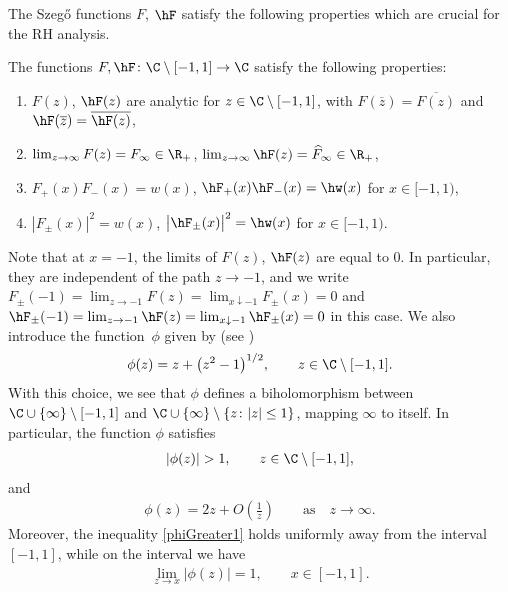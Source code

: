 The Szeg\H{o} functions $F$, $\hF$ satisfy the following properties which are crucial for the RH analysis.

\begin{Proposition}\label{PropertiesF}
The functions $F, \hF \colon \C \setminus [-1,1]\to \C$ satisfy the following properties:
\begin{enumerate}[$(i)$]\itemsep=0pt
 \item $F(z)$, $\hF(z)$ are analytic for $z \in \C \setminus [-1,1]$, with $F(\overline{z}) = \overline{F(z)}$ and $\hF(\overline{z}) = \overline{\hF(z)}$,
 \item $\lim_{z\to\infty} F(z) = F_\infty \in \R_+$, $\lim_{z\to\infty} \hF(z) = \widehat F_\infty \in \R_+$,
 \item $F_+(x)F_-(x) = w(x)$, $\hF_+(x)\hF_-(x) = \hw(x)$ for $x \in [-1,1)$,
 \item $|F_\pm(x)|^2 = w(x)$, $\big|\hF_\pm(x)\big|^2 = \hw(x)$ for $x \in [-1,1)$.
\end{enumerate}
\end{Proposition}
Note that at $x = -1$, the limits of $F(z)$, $\hF(z)$ are equal to $0$. In particular, they are independent of the path $z \to -1$, and we write $F_\pm(-1) = \lim_{z\to -1} F(z) = \lim_{x \downarrow -1} F_\pm(x) = 0$ and $\hF_\pm(-1) = \lim_{z\to -1} \hF(z) = \lim_{x \downarrow -1} \hF_\pm(x) = 0$ in this case.
We also introduce the function~$\phi$ given by (see \cite[Proposition~2.1]{CD})
\begin{align*}
 \phi(z) = z + \big(z^2-1\big)^{1/2}, \qquad z \in \C \setminus [-1,1].
\end{align*}
With this choice, we see that $\phi$ defines a biholomorphism between $\C \cup\lbrace \infty \rbrace \setminus [-1,1]$ and ${\C \cup \lbrace \infty \rbrace \setminus \lbrace z\colon |z| \leq 1 \rbrace}$, mapping $\infty$ to itself. In particular, the function $\phi$ satisfies
\begin{align}\label{phiGreater1}
 |\phi(z)| > 1, \qquad z \in \C \setminus [-1,1],
\end{align}
and
\begin{align*}
 \phi(z) = 2z + O\left(\frac{1}{z}\right) \qquad \mbox{as}\quad z \to \infty.
\end{align*}
Moreover, the inequality \eqref{phiGreater1} holds uniformly away from the interval $[-1,1]$, while on the interval we have
\begin{align}\label{PhionInterval}
 \lim_{z\to x}|\phi(z)| = 1, \qquad x\in[-1,1].
\end{align}
